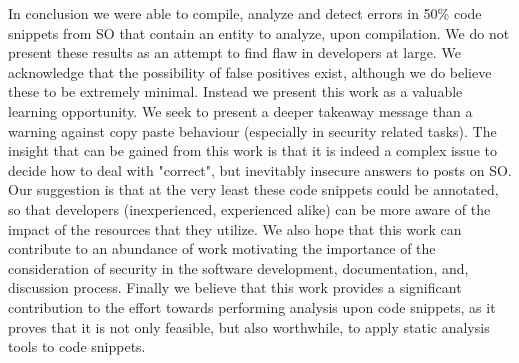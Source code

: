 \documentclass[10pt, conference]{IEEEtran}
\begin{document}
In conclusion we were able to compile, analyze and detect errors in 50\% code snippets from SO that contain an entity to analyze, upon compilation. We do not present these results as an attempt to find flaw in developers at large. We acknowledge that the possibility of false positives exist, although we do believe these to be extremely minimal. Instead we present this work as a valuable learning opportunity. We seek to present a deeper takeaway message than a warning against copy paste behaviour (especially in security related tasks). The insight that can be gained from this work is that it is indeed a complex issue to decide how to deal with "correct", but inevitably insecure answers to posts on SO. Our suggestion is that at the very least these code snippets could be annotated, so that developers (inexperienced, experienced alike) can be more aware of the impact of the resources that they utilize. We also hope that this work can contribute to an abundance of work motivating the importance of the consideration of security in the software development, documentation, and, discussion process. Finally we believe that this work provides a significant contribution to the effort towards performing analysis upon code snippets, as it proves that it is not only feasible, but also worthwhile, to apply static analysis tools to code snippets.

\printbibliography
\end{document}

